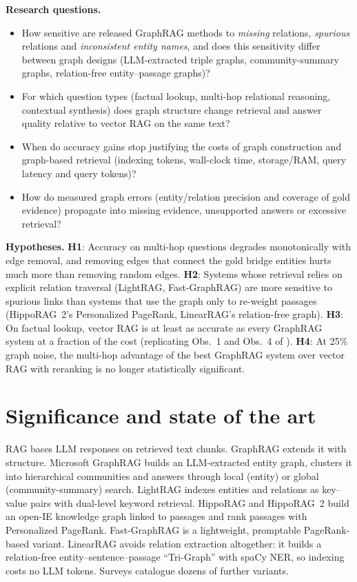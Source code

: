\documentclass[11pt]{article}
\begin{document}
\textbf{Research questions.}
\begin{itemize}
\item[\textbf{RQ1}] How sensitive are released GraphRAG methods to \emph{missing} relations, \emph{spurious} relations and \emph{inconsistent entity names}, and does this sensitivity differ between graph designs (LLM-extracted triple graphs, community-summary graphs, relation-free entity--passage graphs)?
\item[\textbf{RQ2}] For which question types (factual lookup, multi-hop relational reasoning, contextual synthesis) does graph structure change retrieval and answer quality relative to vector RAG on the same text?
\item[\textbf{RQ3}] When do accuracy gains stop justifying the costs of graph construction and graph-based retrieval (indexing tokens, wall-clock time, storage/RAM, query latency and query tokens)?
\item[\textbf{RQ4}] How do measured graph errors (entity/relation precision and coverage of gold evidence) propagate into missing evidence, unsupported answers or excessive retrieval?
\end{itemize}

\textbf{Hypotheses.}
\textbf{H1}: Accuracy on multi-hop questions degrades monotonically with edge removal, and removing edges that connect the gold bridge entities hurts much more than removing random edges.
\textbf{H2}: Systems whose retrieval relies on explicit relation traversal (LightRAG, Fast-GraphRAG) are more sensitive to spurious links than systems that use the graph only to re-weight passages (HippoRAG~2's Personalized PageRank, LinearRAG's relation-free graph).
\textbf{H3}: On factual lookup, vector RAG is at least as accurate as every GraphRAG system at a fraction of the cost (replicating Obs.~1 and Obs.~4 of ).
\textbf{H4}: At 25\% graph noise, the multi-hop advantage of the best GraphRAG system over vector RAG with reranking is no longer statistically significant.

\section{Significance and state of the art}
\label{sec:sota}

RAG \cite{lewis2020rag} bases LLM responses on retrieved text chunks. GraphRAG extends it with structure. Microsoft GraphRAG \cite{edge2024graphrag} builds an LLM-extracted entity graph, clusters it into hierarchical communities and answers through local (entity) or global (community-summary) search. LightRAG \cite{guo2024lightrag} indexes entities and relations as key--value pairs with dual-level keyword retrieval. HippoRAG \cite{gutierrez2024hipporag} and HippoRAG~2 \cite{gutierrez2025hipporag2} build an open-IE knowledge graph linked to passages and rank passages with Personalized PageRank. Fast-GraphRAG \cite{circlemind2024fastgraphrag} is a lightweight, promptable PageRank-based variant. LinearRAG \cite{zhuang2026linearrag} avoids relation extraction altogether: it builds a relation-free entity--sentence--passage ``Tri-Graph'' with spaCy NER, so indexing costs no LLM tokens. Surveys \cite{peng2024graphragsurvey,han2024graphragsurvey} catalogue dozens of further variants.
\end{document}
